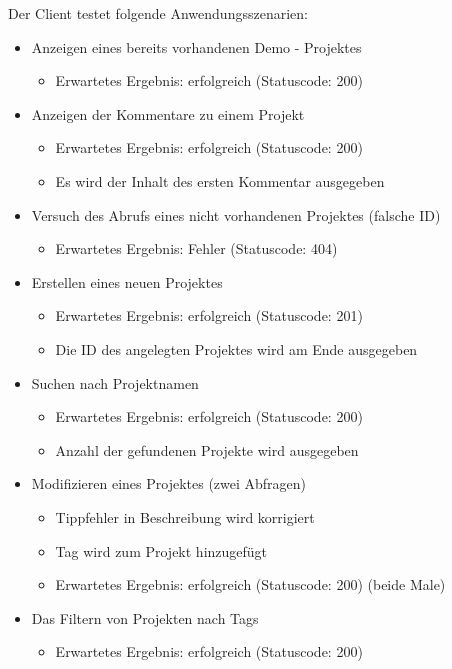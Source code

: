 \documentclass[12pt]{scrartcl}
\begin{document}
	Der Client testet folgende Anwendungsszenarien:
	\begin{itemize}
		\item Anzeigen eines bereits vorhandenen Demo - Projektes
		\begin{itemize}
			\item Erwartetes Ergebnis: erfolgreich (Statuscode: 200)
		\end{itemize}
		\item Anzeigen der Kommentare zu einem Projekt
		\begin{itemize}
			\item Erwartetes Ergebnis: erfolgreich (Statuscode: 200)
			\item Es wird der Inhalt des ersten Kommentar ausgegeben
		\end{itemize}
		\item Versuch des Abrufs eines nicht vorhandenen Projektes (falsche ID)
		\begin{itemize}
			\item Erwartetes Ergebnis: Fehler (Statuscode: 404)
		\end{itemize}
		\item Erstellen eines neuen Projektes
		\begin{itemize}
			\item Erwartetes Ergebnis: erfolgreich (Statuscode: 201)
			\item Die ID des angelegten Projektes wird am Ende ausgegeben
		\end{itemize}
		\item Suchen nach Projektnamen
		\begin{itemize}
			\item Erwartetes Ergebnis: erfolgreich (Statuscode: 200)
			\item Anzahl der gefundenen Projekte wird ausgegeben
		\end{itemize}
		\item Modifizieren eines Projektes (zwei Abfragen)
		\begin{itemize}
			\item Tippfehler in Beschreibung wird korrigiert
			\item Tag wird zum Projekt hinzugefügt
			\item Erwartetes Ergebnis: erfolgreich (Statuscode: 200) (beide Male)
		\end{itemize}
		\item Das Filtern von Projekten nach Tags
		\begin{itemize}
			\item Erwartetes Ergebnis: erfolgreich (Statuscode: 200)

\end{itemize}
\end{itemize}
\end{document}
